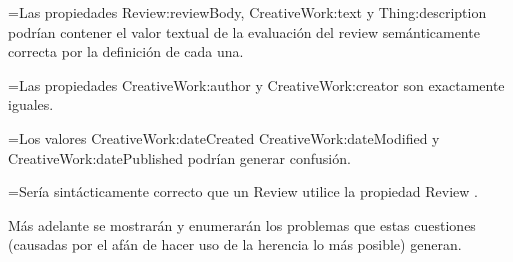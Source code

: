 =Las propiedades Review:reviewBody, CreativeWork:text y Thing:description podrían contener el valor textual de la evaluación del review semánticamente correcta por la definición de cada una.

=Las propiedades CreativeWork:author y CreativeWork:creator son exactamente iguales. 

=Los valores CreativeWork:dateCreated CreativeWork:dateModified y CreativeWork:datePublished podrían generar confusión. 

=Sería sintácticamente correcto que un Review utilice la propiedad Review .

Más adelante se mostrarán y enumerarán los problemas que estas cuestiones (causadas por el afán de hacer uso de la herencia
lo más posible)  generan. 
